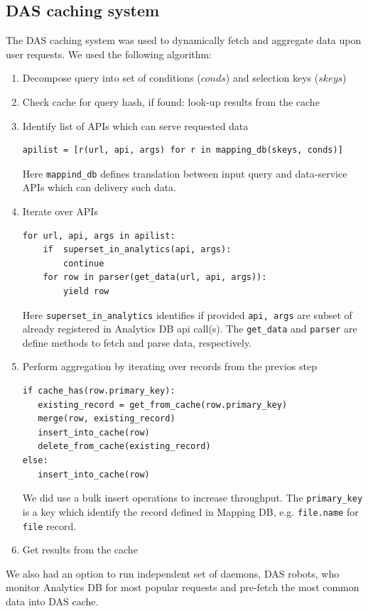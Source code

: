 \documentclass[1p,times]{elsarticle}
\begin{document}
\subsection{DAS caching system}
The DAS caching system was used to dynamically fetch
and aggregate data upon user requests. We used the following 
algorithm:
\begin{enumerate}[1.]
\item Decompose query into set of conditions ($conds$) 
and selection keys ($skeys$)
\item Check cache for query hash, if found: look-up results from the cache
\item Identify list of APIs which can serve requested data
\begin{verbatim}
apilist = [r(url, api, args) for r in mapping_db(skeys, conds)]
\end{verbatim}
Here \verb+mappind_db+ defines translation between input query and data-service
APIs which can delivery such data.
\item Iterate over APIs
\begin{verbatim}
for url, api, args in apilist:
    if  superset_in_analytics(api, args):
        continue
    for row in parser(get_data(url, api, args)):
        yield row
\end{verbatim}
Here \verb+superset_in_analytics+ identifies if provided \verb+api, args+
are subset of already registered in Analytics DB api call(s). The 
\verb+get_data+ and \verb+parser+ are define methods to fetch and parse
data, respectively.
\item Perform aggregation by iterating over records from the previos step
\begin{verbatim}
if cache_has(row.primary_key):
   existing_record = get_from_cache(row.primary_key)
   merge(row, existing_record)
   insert_into_cache(row)
   delete_from_cache(existing_record)
else:
   insert_into_cache(row)
\end{verbatim}
We did use a bulk insert operations to increase throughput. The \verb+primary_key+
is a key which identify the record defined in Mapping DB, e.g. \verb+file.name+
for \verb+file+ record.
\item Get results from the cache
\end{enumerate}
We also had an option to run independent set of daemons, DAS robots, who
monitor Analytics DB for most popular requests and pre-fetch the most
common data into DAS cache. 
\end{document}
